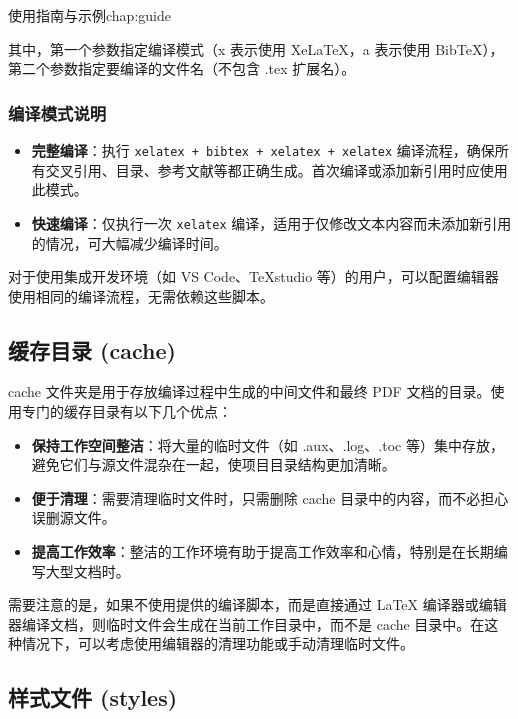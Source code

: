 \begin{cuzchapter}{使用指南与示例}{chap:guide}
\begin{itemize}
              其中，第一个参数指定编译模式（x 表示使用 XeLaTeX，a 表示使用 BibTeX），第二个参数指定要编译的文件名（不包含 .tex 扩展名）。
    \end{itemize}

    \subsubsection{编译模式说明}

    \begin{itemize}
        \item \textbf{完整编译}：执行 \verb|xelatex + bibtex + xelatex + xelatex| 编译流程，确保所有交叉引用、目录、参考文献等都正确生成。首次编译或添加新引用时应使用此模式。

        \item \textbf{快速编译}：仅执行一次 \verb|xelatex| 编译，适用于仅修改文本内容而未添加新引用的情况，可大幅减少编译时间。
    \end{itemize}

    对于使用集成开发环境（如 VS Code、TeXstudio 等）的用户，可以配置编辑器使用相同的编译流程，无需依赖这些脚本。

    \subsection{缓存目录 (cache)}\label{sub:cache}

    cache 文件夹是用于存放编译过程中生成的中间文件和最终 PDF 文档的目录。使用专门的缓存目录有以下几个优点：

    \begin{itemize}
        \item \textbf{保持工作空间整洁}：将大量的临时文件（如 .aux、.log、.toc 等）集中存放，避免它们与源文件混杂在一起，使项目目录结构更加清晰。

        \item \textbf{便于清理}：需要清理临时文件时，只需删除 cache 目录中的内容，而不必担心误删源文件。

        \item \textbf{提高工作效率}：整洁的工作环境有助于提高工作效率和心情，特别是在长期编写大型文档时。
    \end{itemize}

    需要注意的是，如果不使用提供的编译脚本，而是直接通过 LaTeX 编译器或编辑器编译文档，则临时文件会生成在当前工作目录中，而不是 cache 目录中。在这种情况下，可以考虑使用编辑器的清理功能或手动清理临时文件。

    \subsection{样式文件 (styles)}\label{sub:styles}


\end{cuzchapter}
